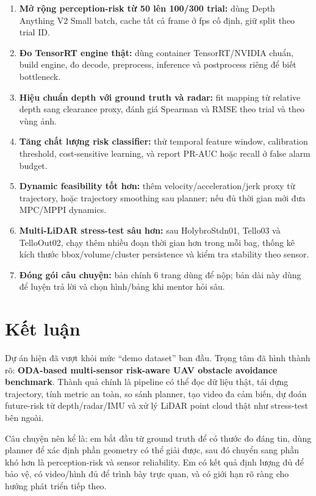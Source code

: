 \documentclass[10pt,a4paper]{article}
\begin{document}
\begin{enumerate}
  \item \textbf{Mở rộng perception-risk từ 50 lên 100/300 trial:} dùng Depth Anything V2 Small batch, cache tất cả frame ở fps cố định, giữ split theo trial ID.
  \item \textbf{Đo TensorRT engine thật:} dùng container TensorRT/NVIDIA chuẩn, build engine, đo decode, preprocess, inference và postprocess riêng để biết bottleneck.
  \item \textbf{Hiệu chuẩn depth với ground truth và radar:} fit mapping từ relative depth sang clearance proxy, đánh giá Spearman và RMSE theo trial và theo vùng ảnh.
  \item \textbf{Tăng chất lượng risk classifier:} thử temporal feature window, calibration threshold, cost-sensitive learning, và report PR-AUC hoặc recall ở false alarm budget.
  \item \textbf{Dynamic feasibility tốt hơn:} thêm velocity/acceleration/jerk proxy từ trajectory, hoặc trajectory smoothing sau planner; nếu đủ thời gian mới đưa MPC/MPPI dynamics.
  \item \textbf{Multi-LiDAR stress-test sâu hơn:} sau HolybroStdn01, Tello03 và TelloOut02, chạy thêm nhiều đoạn thời gian hơn trong mỗi bag, thống kê kích thước bbox/volume/cluster persistence và kiểm tra stability theo sensor.
  \item \textbf{Đóng gói câu chuyện:} bản chính 6 trang dùng để nộp; bản dài này dùng để luyện trả lời và chọn hình/bảng khi mentor hỏi sâu.
\end{enumerate}

\section{Kết luận}

Dự án hiện đã vượt khỏi mức ``demo dataset'' ban đầu. Trọng tâm đã hình thành rõ: \textbf{ODA-based multi-sensor risk-aware UAV obstacle avoidance benchmark}. Thành quả chính là pipeline có thể đọc dữ liệu thật, tái dựng trajectory, tính metric an toàn, so sánh planner, tạo video đa cảm biến, dự đoán future-risk từ depth/radar/IMU và xử lý LiDAR point cloud thật như stress-test bên ngoài.

Câu chuyện nên kể là: em bắt đầu từ ground truth để có thước đo đáng tin, dùng planner để xác định phần geometry có thể giải được, sau đó chuyển sang phần khó hơn là perception-risk và sensor reliability. Em có kết quả định lượng đủ để bảo vệ, có video/hình đủ để trình bày trực quan, và có giới hạn rõ ràng cho hướng phát triển tiếp theo.
\end{document}

